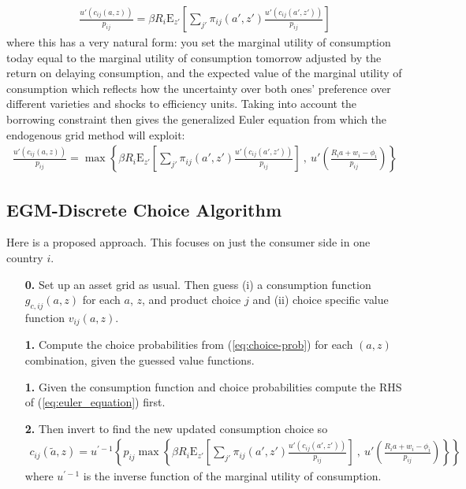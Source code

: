 \documentclass[12pt,pdftex]{article}
\begin{document}
\begin{onehalfspacing}
\begin{align}
\frac{u'(c_{ij}(a, z))}{p_{ij}} = \beta R_{i} \mathrm{E}_{z'} \left[ \sum_{j'} \pi_{ij}(a', z') \frac{u'(c_{ij}(a', z'))}{p_{ij}} \right]
\end{align}
where this has a very natural form: you set the marginal utility of consumption today equal to the marginal utility of consumption tomorrow adjusted by the return on delaying consumption, and the expected value of the marginal utility of consumption which reflects how the uncertainty over both ones' preference over different varieties and shocks to efficiency units. Taking into account the borrowing constraint then gives the generalized Euler equation from which the endogenous grid method will exploit:
\begin{align}
\frac{u'(c_{ij}(a, z))}{p_{ij}} = \max \left\{ \beta R_{i} \mathrm{E}_{z'} \left[ \sum_{j'} \pi_{ij}(a', z') \frac{u'(c_{ij}(a', z'))}{p_{ij}} \right] \ , \  u' \left( \frac{R_i a + w_i - \phi_{i}}{p_{ij}} \right) \right \}
\label{eq:apx-euler_equation}
\end{align}

\subsection{EGM-Discrete Choice Algorithm}

Here is a proposed approach. This focuses on just the consumer side in one country $i$.
\begin{itemize}
\item[\textbf{0.}] Set up an asset grid as usual. Then guess (i) a consumption function $g_{c,ij}(a,z)$ for each $a$, $z$, and product choice $j$ and (ii) choice specific value function $v_{ij}(a,z)$.

\item[\textbf{1.}] Compute the choice probabilities from (\ref{eq:choice-prob}) for each $(a,z)$ combination, given the guessed value functions.

\item[\textbf{1.}] Given the consumption function and choice probabilities compute the RHS of (\ref{eq:euler_equation}) first.

\item[\textbf{2.}] Then invert to find the new updated consumption choice so
\begin{align}
c_{ij}(\tilde a, z) = u^{' -1}\left\{ p_{ij} \max \left\{ \beta R_{i} \mathrm{E}_{z'} \left[ \sum_{j'} \pi_{ij}(a', z') \frac{u'(c_{ij}(a', z'))}{p_{ij}} \right] \ , \  u' \left( \frac{R_i a + w_i - \phi_{i}}{p_{ij}} \right) \right \} \right \}
\end{align}
where $u^{' -1}$ is the inverse function of the marginal utility of consumption.


\end{itemize}
\end{onehalfspacing}
\end{document}
